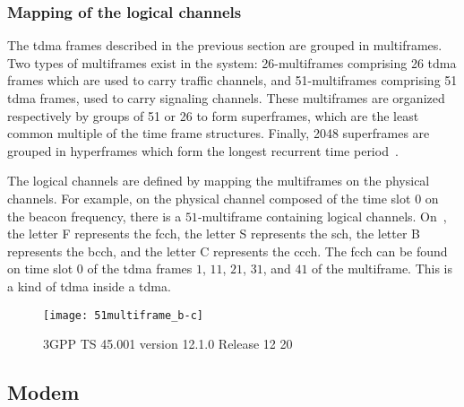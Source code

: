    \subsubsection{Mapping of the logical channels}


      The \gls{tdma} frames described in the previous section are
      grouped in multiframes. Two types of multiframes exist in the
      system: 26-multiframes comprising 26 \gls{tdma} frames which are
      used to carry traffic channels, and 51-multiframes comprising 51
      \gls{tdma} frames, used to carry signaling channels. These
      multiframes are organized respectively by groups of 51 or 26 to
      form superframes, which are the least common multiple of the time
      frame structures. Finally, 2048 superframes are grouped in
      hyperframes which form the longest recurrent time
      period~\cite{3gpp_ts_2015-3,3gpp_ts_2015-4}.

      \iffalse
      This is shown in~\fref{fig:frames}.
      \begin{figure}[h]
        \centering
        \texttt{[image: frames]}
        \caption{Logical channels on the 51-multiframe
        ~\cite{3gpp_ts_2015-3}}
        \label{fig:frames}
      \end{figure}
      \fi

      The logical channels are defined by mapping the multiframes on the
      physical channels. For example, on the physical channel composed
      of the time slot $0$ on the beacon frequency, there is a
      $51$-multiframe containing logical channels.
      On~, the letter F represents the
      \gls{fcch}, the letter S represents the \gls{sch}, the letter B
      represents the \gls{bcch}, and the letter C represents the
      \gls{ccch}. The \gls{fcch} can be found on time slot $0$ of the
      \gls{tdma} frames $1$, $11$, $21$, $31$, and $41$ of the
      multiframe. This is a kind of \gls{tdma} inside a \gls{tdma}.

      \begin{figure}[h]
        \centering
        \texttt{[image: 51multiframe\_b-c]}
        \caption{3GPP TS 45.001 version 12.1.0 Release 12 20}
        \label{fig:51multiframe_b-c}
      \end{figure}

  \subsection{Modem}
  \label{sec:modem}

